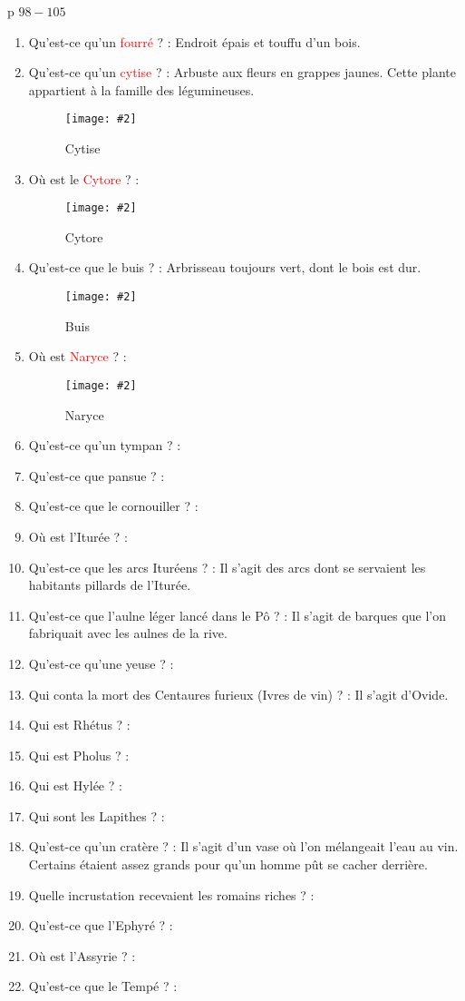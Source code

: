 \documentclass[a4paper, 11pt, hidelinks]{article}
\newcommand{\img}[4]{\begin{figure}[!ht]
    \centering
    \texttt{[image: \#2]}
    \caption{#3}
    \label{#4}
    \end{figure} }
\begin{document}
p $98 - 105$



\begin{enumerate}
      \item Qu'est-ce qu'un \textcolor{red}{fourré} ? : Endroit épais et touffu d'un bois.
      \item Qu'est-ce qu'un \textcolor{red}{cytise} ? : Arbuste aux fleurs en grappes jaunes. Cette plante appartient à la famille des légumineuses.
            \img{0.5}{Cytise.jpg}{Cytise}{95}
      \item Où est le \textcolor{red}{Cytore} ? :
            \img{0.3}{Cytore.png}{Cytore}{96}
      \item Qu'est-ce que le buis ? : Arbrisseau toujours vert, dont le bois est dur.
            \img{0.5}{Buis.jpg}{Buis}{97}
            \newpage
      \item Où est \textcolor{red}{Naryce} ? : 
            \img{0.3}{Naryce.png}{Naryce}{98}
      \item Qu'est-ce qu'un tympan ? :
      \item Qu'est-ce que pansue ? :
      \item Qu'est-ce que le cornouiller ? :
      \item Où est l'Iturée ? :
      \item Qu'est-ce que les arcs Ituréens ? : Il s'agit des arcs dont se servaient les habitants pillards de l'Iturée.
      \item Qu'est-ce que l'aulne léger lancé dans le Pô ? : Il s'agit de barques que l'on fabriquait avec les aulnes de la rive.
      \item Qu'est-ce qu'une yeuse ? :
      \item Qui conta la mort des Centaures furieux (Ivres de vin) ? : Il s'agit d'Ovide.
      \item Qui est Rhétus ? :
      \item Qui est Pholus ? :
      \item Qui est Hylée ? :
      \item Qui sont les Lapithes ? :
      \item Qu'est-ce qu'un cratère ? : Il s'agit d'un vase où l'on mélangeait l'eau au vin. Certains étaient assez grands pour
            qu'un homme pût se cacher derrière.
      \item Quelle incrustation recevaient les romains riches ? :
      \item Qu'est-ce que l'Ephyré ? :
      \item Où est l'Assyrie ? :
      \item Qu'est-ce que le Tempé ? :

\end{enumerate}
\end{document}

